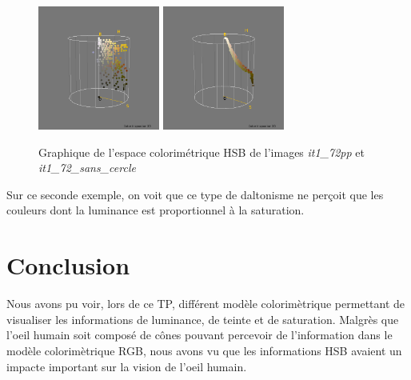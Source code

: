 \documentclass[a4paper,10pt]{article}
\begin{document}
\begin{figure}[!h]
 \begin{center}
 \includegraphics[width=4cm]{resultat/compare2_1.png}
 \includegraphics[width=4cm]{resultat/compare2_2.png}
 \caption{Graphique de l'espace colorimétrique HSB de l'images \textit{it1\_72pp} et \textit{it1\_72\_sans\_cercle}}
 \end{center}
\end{figure}

\newpage

Sur ce seconde exemple, on voit que ce type de daltonisme ne perçoit que les couleurs dont la luminance est proportionnel à 
la saturation.

\section{Conclusion}
Nous avons pu voir, lors de ce TP, différent modèle colorimètrique permettant de visualiser les informations de luminance, de 
teinte et de saturation. Malgrès que l'oeil humain soit composé de cônes pouvant percevoir de l'information dans le modèle
colorimètrique RGB, nous avons vu que les informations HSB avaient un impacte important sur la vision de l'oeil humain.

\newpage
\end{document}
